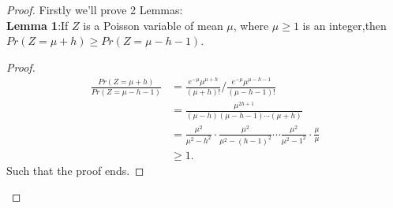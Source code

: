 	\begin{proof}
		Firstly we'll prove 2 Lemmas:\\
	\textbf{Lemma 1}:If $Z$ is a Poisson variable of mean $\mu$, where $\mu \ge 1$ is an integer,then $Pr(Z=\mu + h) \geq Pr(Z=\mu - h - 1)$.
	\begin{proof}
		\begin{equation*}
		\begin{split}
			\frac{Pr(Z=\mu + h)}{Pr(Z=\mu - h - 1)}
			&= \frac{e^{-\mu}\mu^{\mu+h}}{(\mu + h)!} / \frac{e^{-\mu}\mu^{\mu-h-1}}{(\mu-h-1)!}\\
			&= \frac{\mu^{2h+1}}{(\mu-h)(\mu-h-1) \cdots (\mu + h)}\\
			&= \frac{\mu^2}{\mu^2-h^2} \cdot \frac{\mu^2}{\mu^2-(h-1)^2} \cdots \frac{\mu^2}{\mu^2-1^2} \cdot \frac{\mu}{\mu}\\
			&\geq 1.
		\end{split}
	\end{equation*}
	Such that the proof ends.
	\end{proof}
	

\end{proof}
